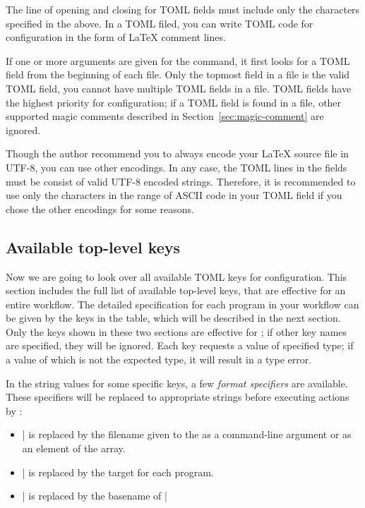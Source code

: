 \documentclass{llmk-doc}
\begin{document}
The line of opening and closing for TOML fields must include only the
characters specified in the above. In a TOML filed, you can write TOML code for
 configuration in the form of {\LaTeX} comment lines.
%
\begin{htcode}
\end{htcode}

If one or more arguments are given for the  command, it first looks
for a TOML field from the beginning of each file. Only the topmost field in a
file is the valid TOML field, \ie you cannot have multiple TOML fields in a
file. TOML fields have the highest priority for  configuration; if a
TOML field is found in a file, other supported magic comments described in
Section~\ref{sec:magic-comment} are ignored.

Though the author recommend you to always encode your {\LaTeX} source file in
UTF-8, you can use other encodings. In any case, the TOML lines in the fields
must be consist of valid UTF-8 encoded strings. Therefore, it is recommended to
use only the characters in the range of ASCII code in your TOML field if you
chose the other encodings for some reasons.

\subsection{Available top-level keys}
\label{sec:top-level-keys}

Now we are going to look over all available TOML keys for 
configuration. This section includes the full list of available top-level keys,
that are effective for an entire workflow. The detailed specification for each
program in your workflow can be given by the keys in the  table,
which will be described in the next section. Only the keys shown in these two
sections are effective for ; if other key names are specified, they
will be ignored. Each key requests a value of specified type; if a value of
which is not the expected type, it will result in a type error.

In the string values for some specific keys, a few \emph{format specifiers} are
available. These specifiers will be replaced to appropriate strings before
executing actions by :
%
\begin{itemize}
\item |%
  is replaced by the filename given to the  as a command-line
  argument or as an element of the  array.
\item |%
  is replaced by the target for each program.
\item |%
  is replaced by the basename of |%
\end{itemize}
\end{document}
